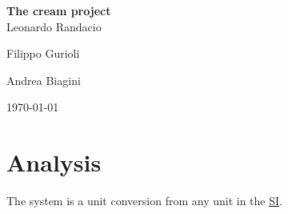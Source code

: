 \documentclass[12pt, a4paper]{report}
\begin{document}
\renewcommand\bibname{References} %


\begin{titlepage}

\begin{center}

\Large \textbf {The cream project}\\%
\vspace{1em}%
\vfill
Leonardo Randacio


Filippo Gurioli


Andrea Biagini

\vspace{1em}
\today

\end{center}

\end{titlepage}


\tableofcontents
\listoffigures
\listoftables

\newpage
{} %

\chapter{Analysis}
The system is a unit conversion from any unit in the \href{https://en.wikipedia.org/wiki/International_System_of_Units}{SI}.
\end{document}
